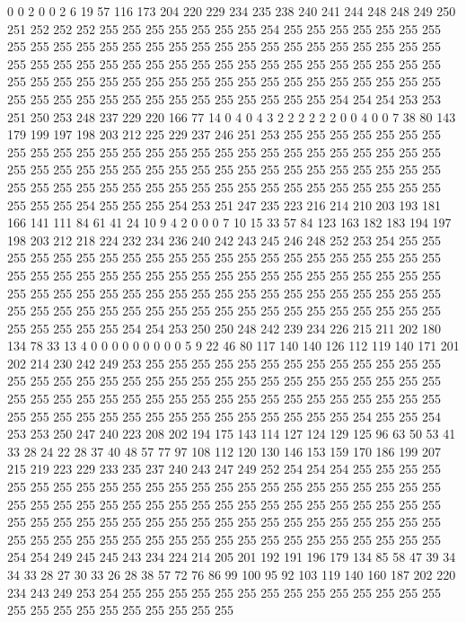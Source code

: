 0 0 2 0 0 2 6 19 57 116 173 204 220 229 234 235 238 240 241 244
248 248 249 250 251 252 252 252 255 255 255 255 255 255 255 254 255 255 255 255
255 255 255 255 255 255 255 255 255 255 255 255 255 255 255 255 255 255 255 255
255 255 255 255 255 255 255 255 255 255 255 255 255 255 255 255 255 255 255 255
255 255 255 255 255 255 255 255 255 255 255 255 255 255 255 255 255 255 255 255
255 255 255 255 255 255 255 255 255 255 255 255 255 255 254 254 254 253 253 251
250 253 248 237 229 220 166 77 14 0 4 0 4 3 2 2 2 2 2 2
0 0 4 0 0 7 38 80 143 179 199 197 198 203 212 225 229 237 246 251
253 255 255 255 255 255 255 255 255 255 255 255 255 255 255 255 255 255 255 255
255 255 255 255 255 255 255 255 255 255 255 255 255 255 255 255 255 255 255 255
255 255 255 255 255 255 255 255 255 255 255 255 255 255 255 255 255 255 255 255
255 255 255 255 255 255 255 255 254 255 255 255 254 253 251 247 235 223 216 214
210 203 193 181 166 141 111 84 61 41 24 10 9 4 2 0 0 0 7 10
15 33 57 84 123 163 182 183 194 197 198 203 212 218 224 232 234 236 240 242
243 245 246 248 252 253 254 255 255 255 255 255 255 255 255 255 255 255 255 255
255 255 255 255 255 255 255 255 255 255 255 255 255 255 255 255 255 255 255 255
255 255 255 255 255 255 255 255 255 255 255 255 255 255 255 255 255 255 255 255
255 255 255 255 255 255 255 255 255 255 255 255 255 255 255 255 255 255 255 255
255 255 255 255 255 255 255 255 255 255 254 254 253 250 250 248 242 239 234 226
215 211 202 180 134 78 33 13 4 0 0 0 0 0 0 0 0 0 5 9
22 46 80 117 140 140 126 112 119 140 171 201 202 214 230 242 249 253 255 255
255 255 255 255 255 255 255 255 255 255 255 255 255 255 255 255 255 255 255 255
255 255 255 255 255 255 255 255 255 255 255 255 255 255 255 255 255 255 255 255
255 255 255 255 255 255 255 255 255 255 255 255 255 255 255 255 255 255 255 255
255 255 255 255 254 255 255 254 253 253 250 247 240 223 208 202 194 175 143 114
127 124 129 125 96 63 50 53 41 33 28 24 22 28 37 40 48 57 77 97
108 112 120 130 146 153 159 170 186 199 207 215 219 223 229 233 235 237 240 243
247 249 252 254 254 254 255 255 255 255 255 255 255 255 255 255 255 255 255 255
255 255 255 255 255 255 255 255 255 255 255 255 255 255 255 255 255 255 255 255
255 255 255 255 255 255 255 255 255 255 255 255 255 255 255 255 255 255 255 255
255 255 255 255 255 255 255 255 255 255 255 255 255 255 255 255 255 255 255 255
255 255 255 255 255 255 254 254 249 245 245 243 234 224 214 205 201 192 191 196
179 134 85 58 47 39 34 34 33 28 27 30 33 26 28 38 57 72 76 86
99 100 95 92 103 119 140 160 187 202 220 234 243 249 253 254 255 255 255 255
255 255 255 255 255 255 255 255 255 255 255 255 255 255 255 255 255 255 255 255
